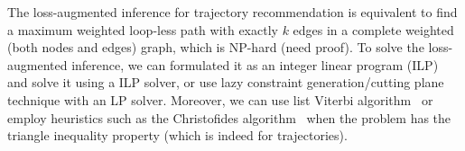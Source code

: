 \documentclass[twocolumn,9pt]{extarticle}
\newcommand{\eat}[1]{}
\begin{document}
The loss-augmented inference for trajectory recommendation is equivalent to 
find a maximum weighted loop-less path with exactly $k$ edges in a complete weighted (both nodes and edges) graph, which is NP-hard (need proof).
To solve the loss-augmented inference, we can formulated it as an integer linear program (ILP) and solve it using a ILP solver,
or use lazy constraint generation/cutting plane technique with an LP solver.
Moreover, we can use list Viterbi algorithm~\cite{nill1995list} or 
employ heuristics such as the Christofides algorithm~\cite{christofides1976} when the problem has the triangle inequality property 
(which is indeed for trajectories).


\eat{
\subsection{Other models}
\label{sec:other}
Label ranking model,
Plackett-Luce probabilistic ranking


\section{Evaluation metrics}
\label{sec:evaluation}
F1 score on points
F1 score on pairs
Kendall's tau, all POIs not appeared in trajectory are ranked last (and share the same rank).
}
\end{document}
